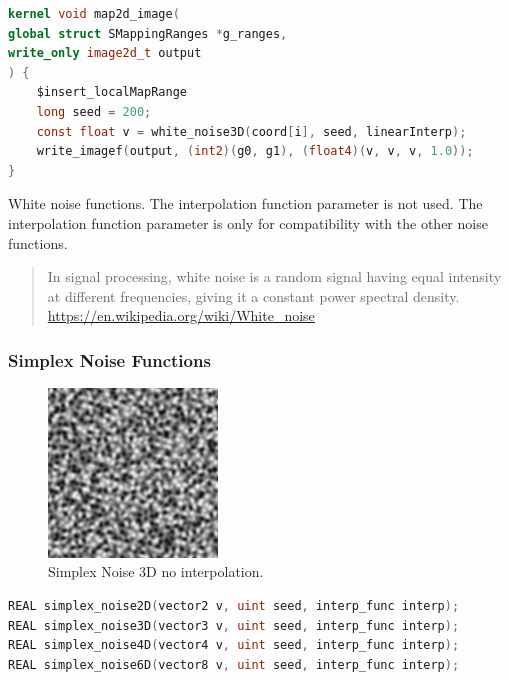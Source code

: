 \begin{lstlisting}[caption={Example for white noise functions},label={lst:white_noise_example},language=OpenCL]
kernel void map2d_image(
global struct SMappingRanges *g_ranges,
write_only image2d_t output
) {
    $insert_localMapRange
    long seed = 200;
    const float v = white_noise3D(coord[i], seed, linearInterp);
    write_imagef(output, (int2)(g0, g1), (float4)(v, v, v, 1.0));
}
\end{lstlisting}

White noise functions. The interpolation function parameter is not used.
The interpolation function parameter is only for compatibility with
the other noise functions.

\begin{quote}
In signal processing, white noise is a random signal having equal
intensity at different frequencies, giving it a constant power spectral density.
\url{https://en.wikipedia.org/wiki/White_noise}
\end{quote}

\subsubsection{Simplex Noise Functions}

\begin{figure}[h]
\centering
\includegraphics[width=0.4\textwidth]{out/noise_functions/simplex_noise3D_noInterp.png}
\caption{Simplex Noise 3D no interpolation.}
\label{fig:simplex_noise3D_noInterp}
\end{figure}

\begin{lstlisting}[caption={Definition of simplex noise functions},label={lst:simplex_noise_definition},language=OpenCL]
REAL simplex_noise2D(vector2 v, uint seed, interp_func interp);
REAL simplex_noise3D(vector3 v, uint seed, interp_func interp);
REAL simplex_noise4D(vector4 v, uint seed, interp_func interp);
REAL simplex_noise6D(vector8 v, uint seed, interp_func interp);
\end{lstlisting}

